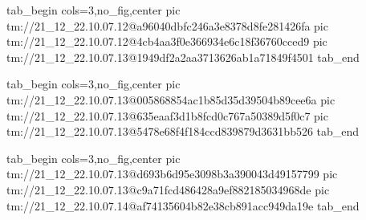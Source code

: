  
 
 
 
 

\qqSecCmtScr


\ifcmt
  tab_begin cols=3,no_fig,center
    pic tm://21_12_22.10.07.12@a96040dbfc246a3e8378d8fe281426fa
    pic tm://21_12_22.10.07.12@4cb4aa3f0e366934e6c18f36760cced9
    pic tm://21_12_22.10.07.13@1949df2a2aa3713626ab1a71849f4501
  tab_end
\fi


\ifcmt
  tab_begin cols=3,no_fig,center
    pic tm://21_12_22.10.07.13@005868854ac1b85d35d39504b89cee6a
    pic tm://21_12_22.10.07.13@635eaaf3d1b8fcd0c767a50389d5f0c7
    pic tm://21_12_22.10.07.13@5478e68f4f184ccd839879d3631bb526
  tab_end
\fi


\ifcmt
  tab_begin cols=3,no_fig,center
    pic tm://21_12_22.10.07.13@d693b6d95e3098b3a390043d49157799
    pic tm://21_12_22.10.07.13@c9a71fcd486428a9ef882185034968de
    pic tm://21_12_22.10.07.14@af74135604b82e38cb891acc949da19e
  tab_end
\fi

